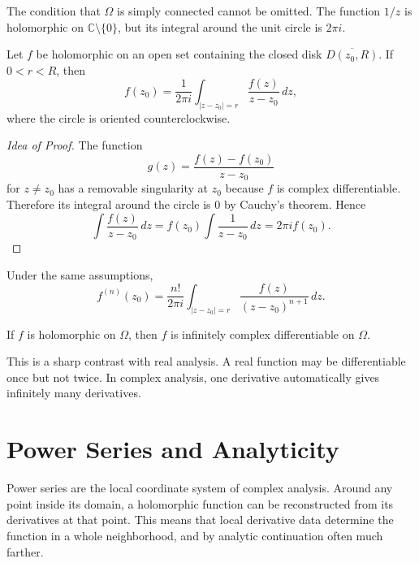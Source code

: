 \begin{remark}
The condition that $\Omega$ is simply connected cannot be omitted. The function $1/z$ is holomorphic on $\mathbb{C}\setminus\{0\}$, but its integral around the unit circle is $2\pi i$.
\end{remark}

\begin{theorem}
Let $f$ be holomorphic on an open set containing the closed disk $\overline{D(z_0,R)}$. If $0<r<R$, then
\[
    f(z_0)=\frac{1}{2\pi i}\int_{|z-z_0|=r}\frac{f(z)}{z-z_0}\,dz,
\]
where the circle is oriented counterclockwise.
\end{theorem}

\begin{proof}[Idea of Proof]
The function
\[
    g(z)=\frac{f(z)-f(z_0)}{z-z_0}
\]
for $z\neq z_0$ has a removable singularity at $z_0$ because $f$ is complex differentiable. Therefore its integral around the circle is $0$ by Cauchy's theorem. Hence
\[
    \int\frac{f(z)}{z-z_0}\,dz
    =f(z_0)\int\frac{1}{z-z_0}\,dz
    =2\pi i f(z_0).
\]
\end{proof}

\begin{theorem}
Under the same assumptions,
\[
    f^{(n)}(z_0)=\frac{n!}{2\pi i}\int_{|z-z_0|=r}\frac{f(z)}{(z-z_0)^{n+1}}\,dz.
\]
\end{theorem}

\begin{corollary}
If $f$ is holomorphic on $\Omega$, then $f$ is infinitely complex differentiable on $\Omega$.
\end{corollary}

\begin{remark}
This is a sharp contrast with real analysis. A real function may be differentiable once but not twice. In complex analysis, one derivative automatically gives infinitely many derivatives.
\end{remark}

\section{Power Series and Analyticity}


Power series are the local coordinate system of complex analysis. Around any point inside its domain, a holomorphic function can be reconstructed from its derivatives at that point. This means that local derivative data determine the function in a whole neighborhood, and by analytic continuation often much farther.

